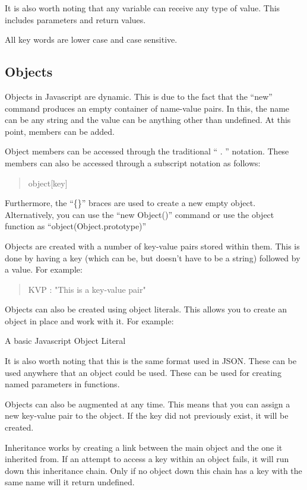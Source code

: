 			It is also worth noting that any variable can receive any type of value.
			This includes parameters and return values.

			All key words are lower case and case sensitive.
		\subsection{Objects}
			Objects in Javascript are dynamic.
			This is due to the fact that the ``new'' command produces an empty container of name-value pairs.
			In this, the name can be any string and the value can be anything other than undefined.
			At this point, members can be added.

			Object members can be accessed through the traditional `` . '' notation.
			These members can also be accessed through a subscript notation as follows:
			\begin{quote}
				object[key]
			\end{quote}
			Furthermore, the ``\{\}'' braces are used to create a new empty object.
			Alternatively, you can use the ``new Object()'' command or
			use the object function as ``object(Object.prototype)''

			Objects are created with a number of key-value pairs stored within them.
			This is done by having a key (which can be, but doesn't have to be a string) followed by a value.
			For example:
			\begin{quote}
				KVP : "This is a key-value pair"
			\end{quote}

			Objects can also be created using object literals.
			This allows you to create an object in place and work with it.
			For example:
			\begin{code}
				\caption{A basic Javascript Object Literal}
				\label{code:JSObjectLiteral}
			\end{code}
			It is also worth noting that this is the same format used in JSON.
			These can be used anywhere that an object could be used.
			These can be used for creating named parameters in functions.

			Objects can also be augmented at any time.
			This means that you can assign a new key-value pair to the object.
			If the key did not previously exist, it will be created.

			Inheritance works by creating a link between the main object and the one it inherited from.
			If an attempt to access a key within an object fails, it will run down this inheritance chain.
			Only if no object down this chain has a key with the same name will it return undefined.

